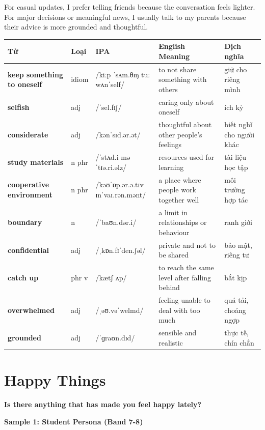 For casual updates, I prefer telling friends because the conversation feels lighter. For major decisions or meaningful news, I usually talk to my parents because their advice is more grounded and thoughtful.

\separator


\vspace{0.8em}
\begin{center}
\renewcommand{\arraystretch}{1.65}
\begin{tabularx}{\textwidth}{|V{0.22\textwidth}|C{0.07\textwidth}|I{0.20\textwidth}|Y|V{0.18\textwidth}|}
\hline
{}
\textbf{Từ} & \textbf{Loại} & \textbf{IPA} & \textbf{English Meaning} & \textbf{Dịch nghĩa} \\
\hline
\textbf{keep something to oneself} & idiom & /kiːp ˈsʌm.θɪŋ tuː wʌnˈself/ & to not share something with others & giữ cho riêng mình \\ \hline
\textbf{selfish} & adj & /ˈsel.fɪʃ/ & caring only about oneself & ích kỷ \\ \hline
\textbf{considerate} & adj & /kənˈsɪd.ər.ət/ & thoughtful about other people's feelings & biết nghĩ cho người khác \\ \hline
\textbf{study materials} & n phr & /ˈstʌd.i məˈtɪə.ri.əlz/ & resources used for learning & tài liệu học tập \\ \hline
\textbf{cooperative environment} & n phr & /kəʊˈɒp.ər.ə.tɪv ɪnˈvaɪ.rən.mənt/ & a place where people work together well & môi trường hợp tác \\ \hline
\textbf{boundary} & n & /ˈbaʊn.dər.i/ & a limit in relationships or behaviour & ranh giới \\ \hline
\textbf{confidential} & adj & /ˌkɒn.fɪˈden.ʃəl/ & private and not to be shared & bảo mật, riêng tư \\ \hline
\textbf{catch up} & phr v & /kætʃ ʌp/ & to reach the same level after falling behind & bắt kịp \\ \hline
\textbf{overwhelmed} & adj & /ˌəʊ.vəˈwelmd/ & feeling unable to deal with too much & quá tải, choáng ngợp \\ \hline
\textbf{grounded} & adj & /ˈɡraʊn.dɪd/ & sensible and realistic & thực tế, chín chắn \\ \hline
\end{tabularx}
\end{center}

\newpage

\section{Happy Things}
\begin{ieltsquestion}
\textbf{Is there anything that has made you feel happy lately?}
\end{ieltsquestion}
\textbf{Sample 1: Student Persona (Band 7-8)}

